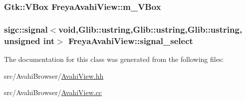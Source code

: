 \label{classFreyaAvahiView_ac65ebb1ece218ba64db9e8dd2a48ef87}
\hypertarget{classFreyaAvahiView_a2795d496bd3c74fc895e86ed8eedaa95}{
\subsubsection[{m\-\_\-\-V\-Box}]{\setlength{\rightskip}{0pt plus 5cm}\-Gtk\-::\-V\-Box {\bf \-Freya\-Avahi\-View\-::m\-\_\-\-V\-Box}}}
\label{classFreyaAvahiView_a2795d496bd3c74fc895e86ed8eedaa95}
\hypertarget{classFreyaAvahiView_a5b23deb59958d5e0d0776ea794255036}{
\subsubsection[{signal\-\_\-select}]{\setlength{\rightskip}{0pt plus 5cm}sigc\-::signal$<$void,\-Glib\-::ustring,\-Glib\-::ustring,\-Glib\-::ustring, unsigned int$>$ {\bf \-Freya\-Avahi\-View\-::signal\-\_\-select}}}
\label{classFreyaAvahiView_a5b23deb59958d5e0d0776ea794255036}


\-The documentation for this class was generated from the following files\-:\begin{DoxyCompactItemize}
\item 
src/\-Avahi\-Browser/\hyperlink{AvahiView_8hh}{\-Avahi\-View.\-hh}\item 
src/\-Avahi\-Browser/\hyperlink{AvahiView_8cc}{\-Avahi\-View.\-cc}\end{DoxyCompactItemize}
